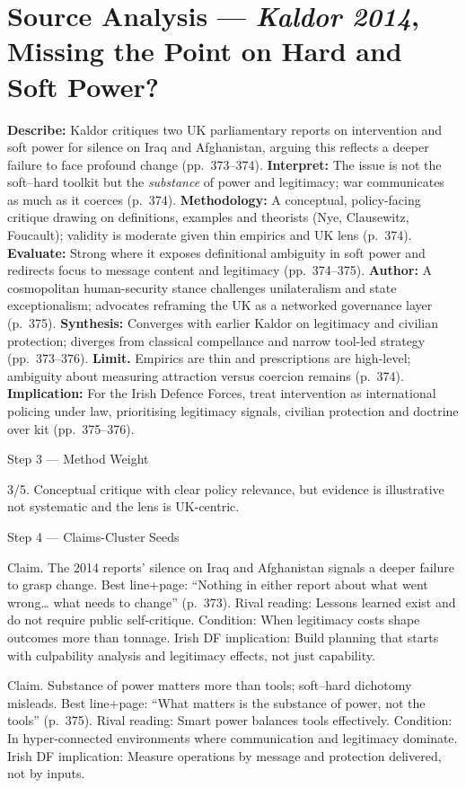 \section*{Source Analysis — \textit{Kaldor 2014}, Missing the Point on Hard and Soft Power?}
\textbf{Describe:} Kaldor critiques two UK parliamentary reports on intervention and soft power for silence on Iraq and Afghanistan, arguing this reflects a deeper failure to face profound change (pp.~373–374).
\textbf{Interpret:} The issue is not the soft–hard toolkit but the \emph{substance} of power and legitimacy; war communicates as much as it coerces (p.~374).
\textbf{Methodology:} A conceptual, policy-facing critique drawing on definitions, examples and theorists (Nye, Clausewitz, Foucault); validity is moderate given thin empirics and UK lens (p.~374).
\textbf{Evaluate:} Strong where it exposes definitional ambiguity in soft power and redirects focus to message content and legitimacy (pp.~374–375).
\textbf{Author:} A cosmopolitan human-security stance challenges unilateralism and state exceptionalism; advocates reframing the UK as a networked governance layer (p.~375).
\textbf{Synthesis:} Converges with earlier Kaldor on legitimacy and civilian protection; diverges from classical compellance and narrow tool-led strategy (pp.~373–376).
\textbf{Limit.} Empirics are thin and prescriptions are high-level; ambiguity about measuring attraction versus coercion remains (p.~374).
\textbf{Implication:} For the Irish Defence Forces, treat intervention as international policing under law, prioritising legitimacy signals, civilian protection and doctrine over kit (pp.~375–376).

Step 3 — Method Weight

3/5. Conceptual critique with clear policy relevance, but evidence is illustrative not systematic and the lens is UK-centric.

Step 4 — Claims-Cluster Seeds

Claim. The 2014 reports’ silence on Iraq and Afghanistan signals a deeper failure to grasp change.
Best line+page: “Nothing in either report about what went wrong… what needs to change” (p.~373).
Rival reading: Lessons learned exist and do not require public self-critique.
Condition: When legitimacy costs shape outcomes more than tonnage.
Irish DF implication: Build planning that starts with culpability analysis and legitimacy effects, not just capability.

Claim. Substance of power matters more than tools; soft–hard dichotomy misleads.
Best line+page: “What matters is the substance of power, not the tools” (p.~375).
Rival reading: Smart power balances tools effectively.
Condition: In hyper-connected environments where communication and legitimacy dominate.
Irish DF implication: Measure operations by message and protection delivered, not by inputs.

